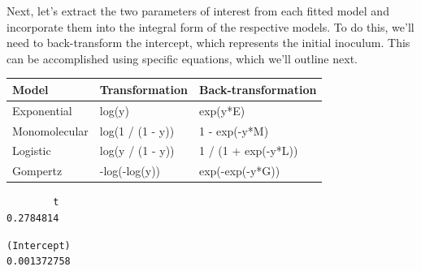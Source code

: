\documentclass[
  letterpaper,
]{book}
\newenvironment{Shaded}{\begin{snugshade}}{\end{snugshade}}
\newcommand{\DecValTok}[1]{\textcolor[rgb]{0.68,0.00,0.00}{#1}}
\newcommand{\FunctionTok}[1]{\textcolor[rgb]{0.28,0.35,0.67}{#1}}
\newcommand{\NormalTok}[1]{\textcolor[rgb]{0.00,0.23,0.31}{#1}}
\newcommand{\OtherTok}[1]{\textcolor[rgb]{0.00,0.23,0.31}{#1}}
\newcommand{\SpecialCharTok}[1]{\textcolor[rgb]{0.37,0.37,0.37}{#1}}
\begin{document}
Next, let's extract the two parameters of interest from each fitted
model and incorporate them into the integral form of the respective
models. To do this, we'll need to back-transform the intercept, which
represents the initial inoculum. This can be accomplished using specific
equations, which we'll outline next.

\begin{longtable}[]{@{}lll@{}}
\toprule\noalign{}
Model & Transformation & Back-transformation \\
\midrule\noalign{}
\endhead
\bottomrule\noalign{}
\endlastfoot
Exponential & log(y) & exp(y*E) \\
Monomolecular & log(1 / (1 - y)) & 1 - exp(-y*M) \\
Logistic & log(y / (1 - y)) & 1 / (1 + exp(-y*L)) \\
Gompertz & -log(-log(y)) & exp(-exp(-y*G)) \\
\end{longtable}

\begin{Shaded}
\end{Shaded}

\begin{verbatim}
        t 
0.2784814 
\end{verbatim}

\begin{Shaded}
\end{Shaded}

\begin{verbatim}
(Intercept) 
0.001372758 
\end{verbatim}

\begin{Shaded}
\end{Shaded}
\end{document}
